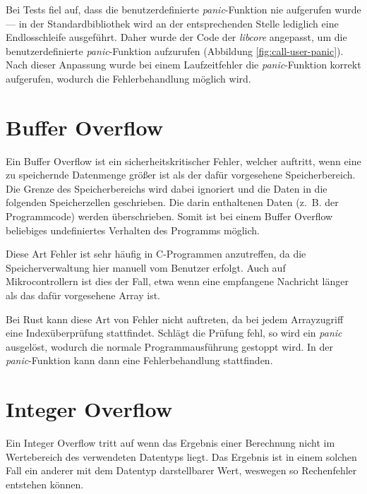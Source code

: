 \documentclass
[ 12pt,
  parskip=half %
]{scrreprt}
\begin{document}
Bei Tests fiel auf, dass die benutzerdefinierte \textit{panic}-Funktion nie aufgerufen wurde --- in der Standardbibliothek wird an der entsprechenden Stelle lediglich eine Endlosschleife ausgeführt. Daher wurde der Code der \textit{libcore} angepasst, um die benutzerdefinierte \textit{panic}-Funktion aufzurufen (Abbildung \ref{fig:call-user-panic}). Nach dieser Anpassung wurde bei einem Laufzeitfehler die \textit{panic}-Funktion korrekt aufgerufen, wodurch die Fehlerbehandlung möglich wird. 


\section{Buffer Overflow}

Ein Buffer Overflow ist ein sicherheitskritischer Fehler, welcher auftritt, wenn eine zu speichernde Datenmenge größer ist als der dafür vorgesehene Speicherbereich. Die Grenze des Speicherbereichs wird dabei ignoriert und die Daten in die folgenden Speicherzellen geschrieben. Die darin enthaltenen Daten (z. B. der Programmcode) werden überschrieben. Somit ist bei einem Buffer Overflow beliebiges undefiniertes Verhalten des Programms möglich.

Diese Art Fehler ist sehr häufig in C-Programmen anzutreffen, da die Speicherverwaltung hier manuell vom Benutzer erfolgt. Auch auf Mikrocontrollern ist dies der Fall, etwa wenn eine empfangene Nachricht länger als das dafür vorgesehene Array ist.

Bei Rust kann diese Art von Fehler nicht auftreten, da bei jedem Arrayzugriff  eine Indexüberprüfung stattfindet. Schlägt die Prüfung fehl, so wird ein \textit{panic} ausgelöst, wodurch die normale Programmausführung gestoppt wird. In der \textit{panic}-Funktion kann dann eine Fehlerbehandlung stattfinden.

\section{Integer Overflow}

Ein Integer Overflow tritt auf wenn das Ergebnis einer Berechnung nicht im Wertebereich des verwendeten Datentyps liegt. Das Ergebnis ist in einem solchen Fall ein anderer mit dem Datentyp darstellbarer Wert, weswegen so Rechenfehler entstehen können.
\end{document}
